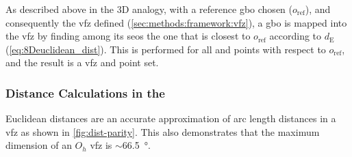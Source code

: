 \documentclass[final,twocolumn,12pt]{elsarticle}
\begin{document}
As described above in the 3D analogy, with a reference \gls{gbo} chosen ($o_{\text{ref}}$), and consequently the \gls{vfz} defined (\cref{sec:methods:framework:vfz}), a \gls{gbo} is mapped into the \gls{vfz} by finding among its \glspl{seo} the one that is closest to $o_{\text{ref}}$ according to $d_{\text{E}}$ (\cref{eq:8Deuclidean_dist}). This is performed for all \inpt{} and \outpt{} points with respect to $o_{\text{ref}}$, and the result is a \gls{vfz} \inpt{} and \outpt{} point set.


\subsubsection{Distance Calculations in the }
\label{sec:methods:framework:vfz-dist}

Euclidean distances are an accurate approximation of arc length distances in a \gls{vfz} as shown in \cref{fig:dist-parity}. This also demonstrates that the maximum dimension of an $O_h$ \gls{vfz} is $\sim$\SI{66.5}{\degree}. %
\end{document}
